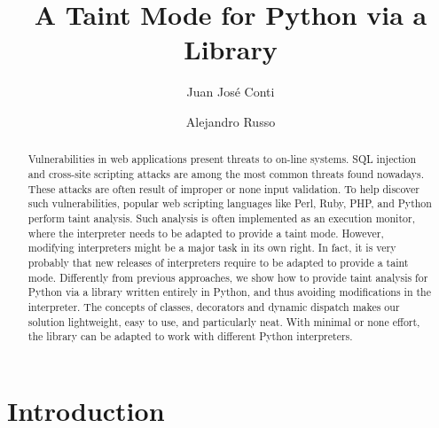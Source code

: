 \documentclass[oribibl]{llncs}
\title{A Taint Mode for Python via a Library}
\institute{
Universidad Tecnol\'{o}gica Nacional, Facultad Regional Santa Fe, Argentina \and 
Chalmers University of Technology, Sweden
}
\author{Juan Jos\'{e} Conti\inst{1} \and  Alejandro Russo\inst{2}}
\begin{document}
\lstset{
        stringstyle=\ttfamily, 
        showstringspaces=false,
        extendedchars=true,  
}



\maketitle
\thispagestyle{plain}




\begin{abstract}
Vulnerabilities in web applications present threats to on-line systems.
SQL injection and cross-site scripting attacks are among the
most common threats found nowadays. These attacks are
often result of improper or none input validation. 
To help discover such vulnerabilities, 
popular web scripting 
languages like Perl, Ruby, PHP, 
and Python perform taint analysis.
Such analysis is often 
implemented as an execution monitor, where the interpreter
needs to be adapted to provide a taint mode. 
However, modifying interpreters might be a major task in its own
right. In fact, it is very probably that  
new releases of interpreters require to 
be adapted to provide a taint mode.
Differently from previous approaches, 
we show how to provide taint analysis for Python via a library
 written entirely in Python, and thus avoiding modifications in the interpreter.
The concepts of classes, decorators and dynamic dispatch
makes our solution lightweight, easy to use, and particularly neat.
With minimal or none effort, the library can be adapted
to work with different Python interpreters.
\end{abstract}
 
\section{Introduction}
\label{sec:intro}
\end{document}
